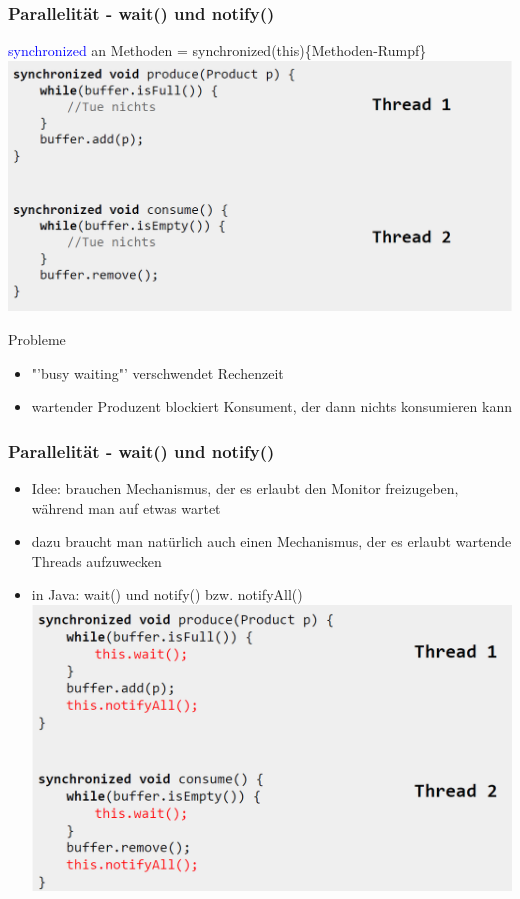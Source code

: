 \documentclass[18pt]{beamer}
\begin{document}
	\begin{frame}
		\frametitle{Parallelität - wait() und notify()}
		\textcolor{blue}{synchronized} an Methoden = synchronized(this)\{Methoden-Rumpf\} \pause
		\includegraphics[scale=0.3]{./pics/tut5/cons-prod.png}
		\begin{alertblock}{Probleme}
			\begin{itemize}
				\pause
				\item "'busy waiting"' verschwendet Rechenzeit \pause
				\item wartender Produzent blockiert Konsument, der dann nichts konsumieren kann 
			\end{itemize}
		\end{alertblock}
	\end{frame}

	\begin{frame}
		\frametitle{Parallelität - wait() und notify()}
		\begin{itemize}
			\item Idee: brauchen Mechanismus, der es erlaubt den Monitor freizugeben, während man auf etwas wartet \pause
			\item dazu braucht man natürlich auch einen Mechanismus, der es erlaubt wartende Threads aufzuwecken \pause
			\item in Java: wait() und notify() bzw. notifyAll() \pause
			\includegraphics[scale=0.3]{./pics/tut5/cons-prod-sol.png}
		\end{itemize}
	\end{frame}
\end{document}
